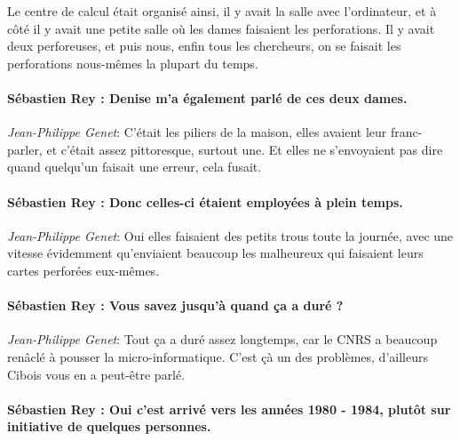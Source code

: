 Le centre de calcul était organisé ainsi, il y avait la salle avec l'ordinateur, et à côté il y avait une petite salle où les dames  faisaient les perforations. Il y avait deux perforeuses, et puis nous, enfin tous les chercheurs, on se faisait les perforations nous-mêmes la plupart du temps. 

\paragraph*{Sébastien Rey : Denise m'a également parlé de ces deux dames.}

\noindent\emph{Jean-Philippe Genet}: C'était les piliers de la maison, elles avaient leur franc-parler, et c'était assez pittoresque, surtout une. Et elles ne s'envoyaient pas dire quand quelqu'un faisait une erreur, cela fusait. 
 
\paragraph*{Sébastien Rey : Donc celles-ci étaient employées à plein temps.}

\noindent\emph{Jean-Philippe Genet}: Oui elles faisaient des petits trous toute la journée, avec une vitesse évidemment qu'enviaient beaucoup les malheureux qui faisaient leurs cartes perforées eux-mêmes.

\paragraph*{Sébastien Rey : Vous savez jusqu'à quand ça a duré ?}

\noindent\emph{Jean-Philippe Genet}: Tout ça a duré assez longtemps, car le CNRS a beaucoup renâclé à pousser la micro-informatique. C'est çà un des problèmes, d'ailleurs Cibois vous en a peut-être parlé.

\paragraph*{Sébastien Rey : Oui c'est arrivé vers les années 1980 - 1984, plutôt sur initiative de quelques personnes.}

